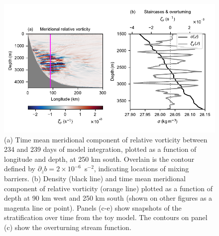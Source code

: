\begin{figure}
    \centering
    \includegraphics{../figures/Figure3.pdf}
    \caption{(a) Time mean meridional component of relative vorticity between 234 and 239 days of model integration, plotted as a function of longitude and depth, at 250 km south. Overlain is the contour defined by $\partial_z b = 2 \times 10^{-6}$~s$^{-2}$, indicating locations of mixing barriers. (b) Density (black line) and time mean meridional component of relative vorticity (orange line) plotted as a function of depth at 90 km west and 250 km south (shown on other figures as a magenta line or point). Panels (c-e) show snapshots of the stratification over time from the toy model. The contours on panel (c) show the overturning stream function.}
    \label{fig:StaircaseMechanism}
\end{figure}

